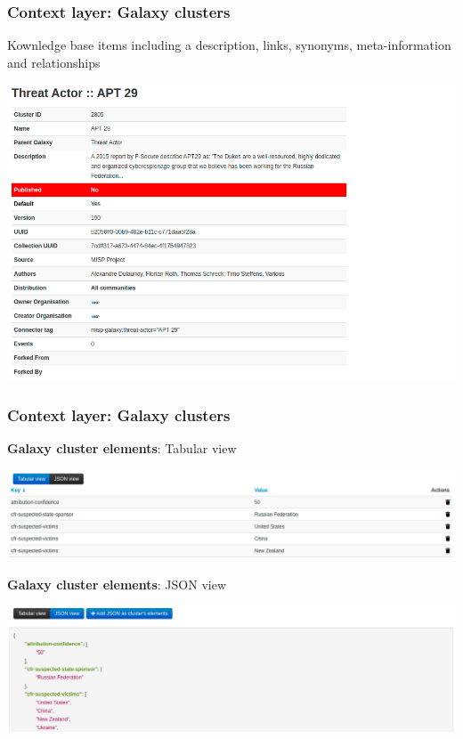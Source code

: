 \begin{frame}
    \frametitle{Context layer: Galaxy clusters}
    Kownledge base items including a description, links, synonyms, meta-information and relationships
    \begin{center}
        \includegraphics[width=0.9\linewidth]{screenshots/cluster-view.png}
    \end{center}
\end{frame}
\begin{frame}
    \frametitle{Context layer: Galaxy clusters}
    {\bf Galaxy cluster elements}: Tabular view
    \begin{center}
        \includegraphics[width=1.0\linewidth]{screenshots/cluster-elements-tab.png}
    \end{center}
    \vspace{1em}
    {\bf Galaxy cluster elements}: JSON view
    \begin{center}
        \includegraphics[width=1.0\linewidth]{screenshots/cluster-elements-json.png}
    \end{center}
\end{frame}

